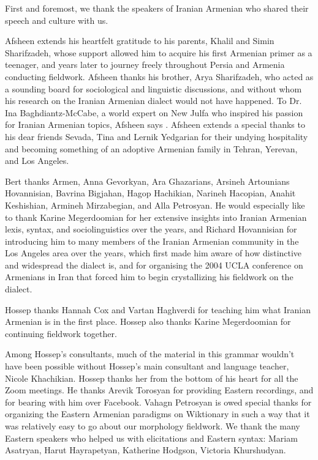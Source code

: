 \addchap{\lsAcknowledgementTitle}

First and foremost, we thank the speakers of Iranian Armenian who shared their speech and culture with us. 

Afsheen extends his heartfelt gratitude to his parents, Khalil and Simin Sharifzadeh, whose support allowed him to acquire his first Armenian primer as a teenager, and years later to journey freely throughout Persia and Armenia conducting fieldwork. Afsheen thanks his brother, Arya Sharifzadeh, who acted as a sounding board for sociological and linguistic discussions, and without whom his research on the Iranian Armenian dialect would not have happened. To Dr. Ina Baghdiantz-McCabe, a world expert on New Julfa who inspired his passion for Iranian Armenian topics, Afsheen says . Afsheen extends a special thanks to his dear friends Sevada, Tina and Lernik Yedgarian for their undying hospitality and becoming something of an adoptive Armenian family in Tehran, Yerevan, and Los Angeles.

 
Bert thanks Armen, Anna Gevorkyan, Ara Ghazarians, Arsineh Artounians Hovannisian, Bavrina Bigjahan, Hagop Hachikian, Narineh Hacopian,  Anahit Keshishian, Armineh Mirzabegian, and Alla Petrosyan. He would especially like to thank  Karine Megerdoomian for her extensive insights into Iranian Armenian lexis, syntax, and sociolinguistics over the years, and Richard Hovannisian for introducing him to many members of the Iranian Armenian community in the Los Angeles area over the years, which first made him aware of how distinctive and widespread the dialect is, and for organising the 2004 UCLA conference on Armenians in Iran that forced him to begin crystallizing his fieldwork on the dialect.



Hossep thanks Hannah Cox and  Vartan Haghverdi  for teaching him what Iranian Armenian is in the first place.   Hossep also thanks Karine Megerdoomian for continuing fieldwork together. 

Among Hossep's consultants, much of the material in this grammar wouldn't have been possible without Hossep's main consultant and language teacher, Nicole Khachikian. Hossep thanks her from the bottom of his heart for all the Zoom meetings.  He thanks Arevik Torosyan for providing Eastern recordings, and for bearing with him over Facebook. Vahagn Petrosyan is owed special thanks for organizing the Eastern Armenian paradigms on Wiktionary in such a way that it was relatively easy to go about our morphology fieldwork.  We thank the many Eastern speakers who helped us with elicitations and Eastern syntax: Mariam Asatryan, Harut Hayrapetyan, Katherine Hodgson, Victoria Khurshudyan.  



